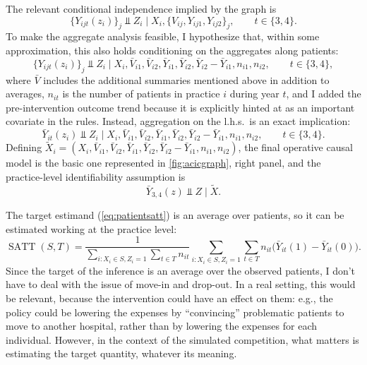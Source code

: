 \documentclass[a4paper]{article}
\theoremstyle{definition}
\begin{document}
    The relevant conditional independence implied by the graph is
    \begin{equation}
        \{Y_{ijt}(z_i)\}_j \Perp Z_i \mid X_i, \{V_{ij}, Y_{ij1}, Y_{ij2}\}_j, \qquad t \in\{3,4\}.
        \label{eq:exactunconfoundedness}
    \end{equation}
    To make the aggregate analysis feasible, I hypothesize that, within some approximation, this also holds conditioning on the aggregates along patients:
    \begin{equation}
        \{Y_{ijt}(z_i)\}_j \Perp Z_i \mid
        X_i,
        \bar V_{i1}, \bar V_{i2},
        \bar Y_{i1}, \bar Y_{i2}, \bar Y_{i2} - \bar Y_{i1},
        n_{i1}, n_{i2},
        \qquad t \in\{3,4\},
        \label{eq:approxunconfoundedness}
    \end{equation}
    where $\bar V$ includes the additional summaries mentioned above in addition to averages, $n_{it}$ is the number of patients in practice $i$ during year $t$, and I added the pre-intervention outcome trend because it is explicitly hinted at as an important covariate in the rules. Instead, aggregation on the l.h.s.\ is an exact implication:
    \begin{equation}
        \bar Y_{it}(z_i) \Perp Z_i \mid X_i, \bar V_{i1}, \bar V_{i2}, \bar Y_{i1}, \bar Y_{i2}, \bar Y_{i2} - \bar Y_{i1}, n_{i1}, n_{i2}, \qquad t \in\{3,4\}.
    \end{equation}
    Defining $\tilde X_i = (X_i, \bar V_{i1}, \bar V_{i2}, \bar Y_{i1}, \bar Y_{i2}, \bar Y_{i2} - \bar Y_{i1}, n_{i1}, n_{i2})$, the final operative causal model is the basic one represented in \autoref{fig:acicgraph}, right panel, and the practice-level identifiability assumption is
    \begin{equation}
        \bar Y_{3,4}(z) \Perp Z \mid \tilde X.
    \end{equation}

    The target estimand (\autoref{eq:patientsatt}) is an average over patients, so it can be estimated working at the practice level:
    \begin{equation}
        \operatorname{SATT}(S,T) =
        \frac 1 {\sum_{i:X_i \in S, Z_i = 1} \sum_{t\in T} n_{it}}
        \sum_{i:X_i \in S, Z_i = 1} \sum_{t\in T} 
        n_{it} \big(\bar Y_{it}(1) - \bar Y_{it}(0)\big).
        \label{eq:sattaggr}
    \end{equation}
    Since the target of the inference is an average over the observed patients, I don't have to deal with the issue of move-in and drop-out. In a real setting, this would be relevant, because the intervention could have an effect on them: e.g., the policy could be lowering the expenses by ``convincing'' problematic patients to move to another hospital, rather than by lowering the expenses for each individual. However, in the context of the simulated competition, what matters is estimating the target quantity, whatever its meaning.
\end{document}
